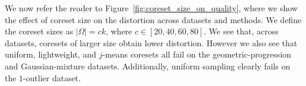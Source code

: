 We now refer the reader to Figure~\ref{fig:coreset_size_on_quality}, where we show the effect of coreset size on the distortion across datasets and methods.
We define the coreset sizes as $|\Omega| = ck$, where $c \in [20, 40, 60, 80]$. We see that, across datasets, coresets of larger size obtain lower distortion. However
we also see that uniform, lightweight, and $j$-means coresets all fail on the geometric-progression and Gaussian-mixture datasets. Additionally, uniform
sampling clearly fails on the $1$-outlier dataset.




